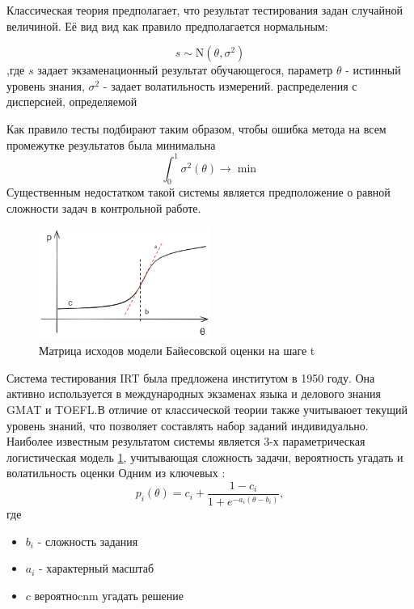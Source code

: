 Классическая теория предполагает, что результат тестирования задан случайной величиной. Её вид вид как правило предполагается нормальным:

\begin{equation}
    s \sim \mathrm{N}(\theta,\sigma^2)  
\end{equation}
,где $s$ задает экзаменационный результат обучающегося, параметр $\theta$ - истинный уровень знания, $\sigma^2$ - задает волатильность измерений. распределения с дисперсией, определяемой 

Как правило тесты подбирают таким образом, чтобы ошибка метода на всем промежутке результатов была минимальна
$$
    \int_0^1 \sigma^2(\theta) \rightarrow \min
$$
Существенным недостатком такой системы является предположение о равной сложности задач в контрольной работе.


\begin{figure}[h]
    \centering
    \includegraphics[width=0.5\textwidth]{assets/pedagogic/social/irt.excalidraw.png}
    \caption{Матрица исходов модели Байесовской оценки на шаге t}
    \label{irt_function}
\end{figure}

Система тестирования IRT была предложена институтом в 1950 году. Она активно используется в международных экзаменах языка
и делового знания GMAT и TOEFL.В отличие от классической теории также учитываюет текущий уровень знаний, что позволяет составлять набор заданий индивидуально.
Наиболее известным результатом системы является 3-х параметрическая логистическая модель \ref{irt_function}, учитывающая сложность задачи, вероятность угадать и волатильность оценки Одним из ключевых \cite{lord1956measurement}:
\begin{equation}
    p_i(\theta) = c_i + \frac{1-c_i}{1+e^{-a_i(\theta-b_i)}},
\end{equation}
где \begin{itemize}
    \item $b_i$ - сложность задания
    \item $a_i$ - характерный масштаб
    \item $c$ вероятноcnm угадать решение
\end{itemize}

